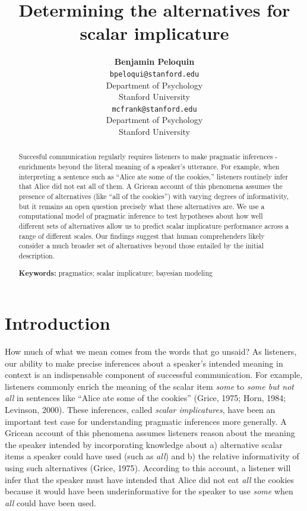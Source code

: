 \documentclass[10pt, letterpaper]{article}
\title{Determining the alternatives for scalar implicature}
\author{{\large \bf Benjamin Peloquin} \\ \texttt{bpeloqui@stanford.edu} \\ Department of Psychology \\ Stanford University \And {\large \bf Michael C. Frank} \\ \texttt{mcfrank@stanford.edu} \\ Department of Psychology \\ Stanford University}
\begin{document}
\maketitle

\begin{abstract}
Succesful communication regularly requires listeners to make pragmatic
inferences - enrichments beyond the literal meaning of a speaker's
utterance. For example, when interpreting a sentence such as ``Alice ate
some of the cookies,'' listeners routinely infer that Alice did not eat
all of them. A Gricean account of this phenomena assumes the presence of
alternatives (like ``all of the cookies'') with varying degrees of
informativity, but it remains an open question precisely what these
alternatives are. We use a computational model of pragmatic inference to
test hypotheses about how well different sets of alternatives allow us
to predict scalar implicature performance across a range of different
scales. Our findings suggest that human comprehenders likely consider a
much broader set of alternatives beyond those entailed by the initial
description.

\textbf{Keywords:}
pragmatics; scalar implicature; bayesian modeling
\end{abstract}

\section{Introduction}\label{introduction}

How much of what we mean comes from the words that go unsaid? As
listeners, our ability to make precise inferences about a speaker's
intended meaning in context is an indispensable component of successful
communication. For example, listeners commonly enrich the meaning of the
scalar item \emph{some} to \emph{some but not all} in sentences like
``Alice ate some of the cookies'' (Grice, 1975; Horn, 1984; Levinson,
2000). These inferences, called \emph{scalar implicatures}, have been an
important test case for understanding pragmatic inferences more
generally. A Gricean account of this phenomena assumes listeners reason
about the meaning the speaker intended by incorporating knowledge about
a) alternative scalar items a speaker could have used (such as
\emph{all}) and b) the relative informativity of using such alternatives
(Grice, 1975). According to this account, a listener will infer that the
speaker must have intended that Alice did not eat \emph{all} the cookies
because it would have been underinformative for the speaker to use
\emph{some} when \emph{all} could have been used.
\end{document}
